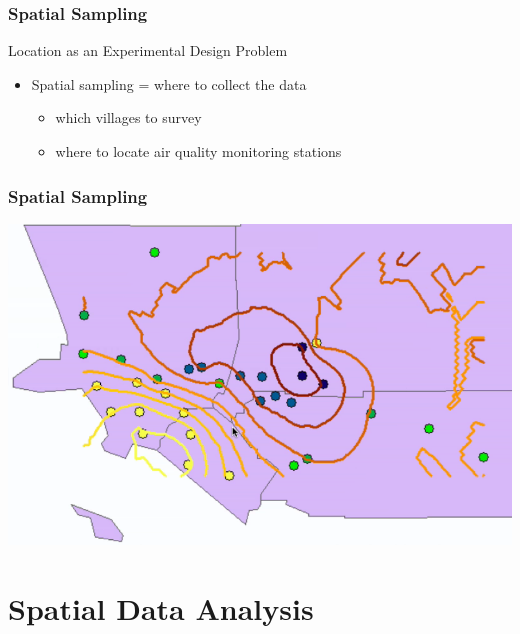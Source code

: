 \documentclass[nototal]{beamer}
\begin{document}
   \begin{frame}
     \frametitle{Spatial Sampling}
     \begin{block}{Location as an Experimental Design Problem}
       \begin{itemize}
	 \item Spatial sampling = where to collect the data
	   \begin{itemize}
	     \item which villages to survey
	     \item where to locate air quality monitoring stations
	   \end{itemize}
       \end{itemize}
      \end{block}
    \end{frame}


    \begin{frame}
      \frametitle{Spatial Sampling}
      \begin{center}
	\includegraphics[width=.65\linewidth]{laozone.png}
      \end{center}
    \end{frame}

\section{Spatial Data Analysis} 
\end{document}
